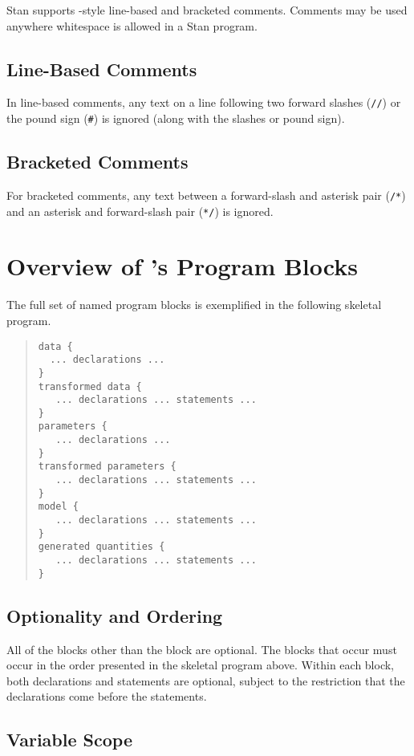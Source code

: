 Stan supports \Cpp-style line-based and bracketed comments.  Comments
may be used anywhere whitespace is allowed in a Stan program.

\subsection{Line-Based Comments}

In line-based comments, any text on a line following
two forward slashes (\Verb|//|) or the pound sign (\Verb|#|)
is ignored (along with the slashes or pound sign).  

\subsection{Bracketed Comments}

For bracketed comments, any text between a forward-slash and asterisk
pair (\Verb|/*|) and an asterisk and forward-slash pair (\Verb|*/|) is
ignored.


\section{Overview of \Stan's Program Blocks}

The full set of named program blocks is exemplified in the following
skeletal \Stan program.
%
\begin{quote}
\begin{Verbatim} 
data { 
  ... declarations ...
}
transformed data { 
   ... declarations ... statements ... 
}
parameters { 
   ... declarations ... 
}
transformed parameters { 
   ... declarations ... statements ...
}
model { 
   ... declarations ... statements ...
}
generated quantities {
   ... declarations ... statements ...
}
\end{Verbatim}
\end{quote}
%

\subsection{Optionality and Ordering}

All of the blocks other than the  block are optional.  The
blocks that occur must occur in the order presented in the skeletal
program above.  Within each block, both declarations and statements
are optional, subject to the restriction that the declarations come
before the statements.

\subsection{Variable Scope}

